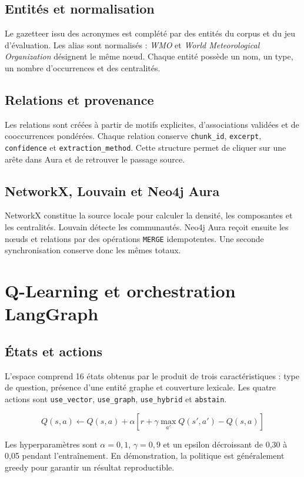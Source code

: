 \documentclass[12pt,a4paper,oneside]{report}
\newcommand{\tech}[1]{\texttt{#1}}
\begin{document}
\subsection{Entités et normalisation}
Le gazetteer issu des acronymes est complété par des entités du corpus et du jeu d'évaluation. Les alias sont normalisés : \textit{WMO} et \textit{World Meteorological Organization} désignent le même nœud. Chaque entité possède un nom, un type, un nombre d'occurrences et des centralités.

\subsection{Relations et provenance}
Les relations sont créées à partir de motifs explicites, d'associations validées et de cooccurrences pondérées. Chaque relation conserve \tech{chunk\_id}, \tech{excerpt}, \tech{confidence} et \tech{extraction\_method}. Cette structure permet de cliquer sur une arête dans Aura et de retrouver le passage source.

\subsection{NetworkX, Louvain et Neo4j Aura}
NetworkX constitue la source locale pour calculer la densité, les composantes et les centralités. Louvain détecte les communautés. Neo4j Aura reçoit ensuite les nœuds et relations par des opérations \tech{MERGE} idempotentes. Une seconde synchronisation conserve donc les mêmes totaux.

\section{Q-Learning et orchestration LangGraph}
\subsection{États et actions}
L'espace comprend 16 états obtenus par le produit de trois caractéristiques : type de question, présence d'une entité graphe et couverture lexicale. Les quatre actions sont \tech{use\_vector}, \tech{use\_graph}, \tech{use\_hybrid} et \tech{abstain}.

\begin{equation}
Q(s,a) \leftarrow Q(s,a) + \alpha \left[r + \gamma \max_{a'}Q(s',a') - Q(s,a)\right]
\end{equation}

Les hyperparamètres sont $\alpha=0{,}1$, $\gamma=0{,}9$ et un epsilon décroissant de 0,30 à 0,05 pendant l'entraînement. En démonstration, la politique est généralement greedy pour garantir un résultat reproductible.
\end{document}
